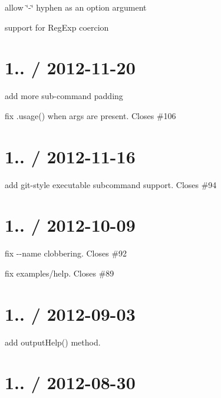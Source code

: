 \begin{DoxyItemize}
\item allow \char`\"{}-\/\char`\"{} hyphen as an option argument
\item support for Reg\+Exp coercion
\end{DoxyItemize}

\section*{1.. / 2012-\/11-\/20 }


\begin{DoxyItemize}
\item add more sub-\/command padding
\item fix .usage() when args are present. Closes \#106
\end{DoxyItemize}

\section*{1.. / 2012-\/11-\/16 }


\begin{DoxyItemize}
\item add git-\/style executable subcommand support. Closes \#94
\end{DoxyItemize}

\section*{1.. / 2012-\/10-\/09 }


\begin{DoxyItemize}
\item fix {\ttfamily -\/-\/name} clobbering. Closes \#92
\item fix examples/help. Closes \#89
\end{DoxyItemize}

\section*{1.. / 2012-\/09-\/03 }


\begin{DoxyItemize}
\item add {\ttfamily output\+Help()} method.
\end{DoxyItemize}

\section*{1.. / 2012-\/08-\/30 }


